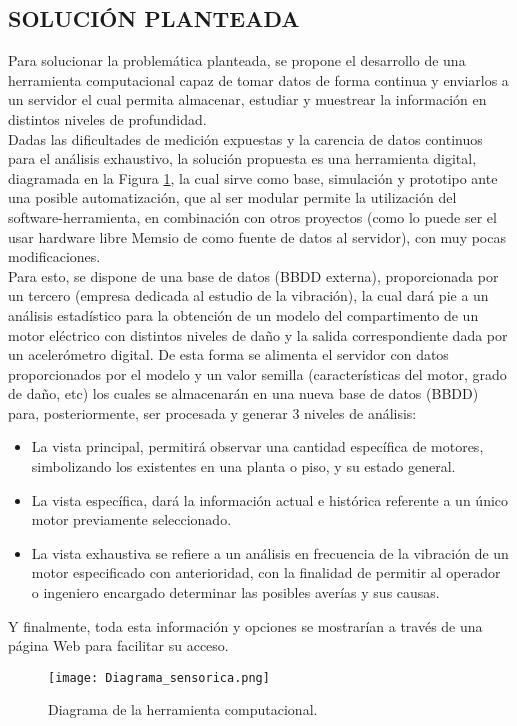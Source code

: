 

\subsection{SOLUCIÓN PLANTEADA}

Para solucionar la problemática planteada, se propone el desarrollo de una herramienta computacional capaz de tomar datos de forma continua y enviarlos  a un servidor el cual permita  almacenar, estudiar y muestrear la información en distintos niveles de profundidad.\\


Dadas las dificultades de medición expuestas y la carencia de datos continuos para el análisis exhaustivo, la solución propuesta es una herramienta digital, diagramada en la Figura \ref{diagrama}, la cual sirve como base, simulación y prototipo ante  una posible automatización, que al ser modular permite la utilización del software-herramienta, en combinación con otros proyectos (como lo puede ser el usar hardware libre Memsio de \textcite{Koene} como fuente de datos al servidor), con muy pocas modificaciones.\\


Para esto, se dispone de una base de datos (BBDD externa), proporcionada por un tercero (empresa dedicada al estudio de la vibración), la cual dará pie a un análisis estadístico para la obtención de un modelo del compartimento de un motor eléctrico con distintos niveles de daño y la salida correspondiente dada por un acelerómetro digital. De esta forma se alimenta el servidor con datos proporcionados por el modelo y un valor semilla (características del motor, grado de daño, etc) los cuales se almacenarán en una nueva base de datos (BBDD) para, posteriormente, ser procesada y  generar 3 niveles de análisis: \\


\begin{itemize}
\item La vista principal, permitirá observar una cantidad específica de motores, simbolizando los existentes en una planta o piso, y su estado general.

\item La vista específica, dará la información actual e histórica referente a un único motor previamente seleccionado.

\item La vista exhaustiva se refiere a un análisis en frecuencia de la vibración de un motor especificado con anterioridad, con la finalidad de permitir al operador o ingeniero encargado determinar las posibles averías y sus causas.
\end{itemize}


Y finalmente, toda esta información y opciones se mostrarían a través de una página Web para facilitar su acceso.\\



\begin{figure}[htb]
\centering
\caption{Diagrama de la herramienta computacional.}
\label{diagrama}
\texttt{[image: Diagrama\_sensorica.png]}
\end{figure}
